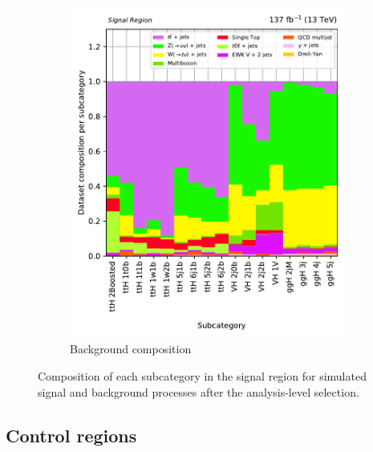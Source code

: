 \begin{figure}[htbp]
\begin{subfigure}[b]{0.4\textwidth}
        \includegraphics[width=\textwidth]{figures/region_plots/full_Run2/region_0/background_composition.pdf}
        \caption{Background composition}
    \end{subfigure}
    \caption[Composition of each subcategory in the signal region for simulated signal and background processes after the analysis-level selection]{Composition of each subcategory in the signal region for simulated signal and background processes after the analysis-level selection.}
    \label{fig:htoinv_sr_composition_comb2016to18}
\end{figure}





\subsection{Control regions}
\label{subsec:htoinv_control_regions}


